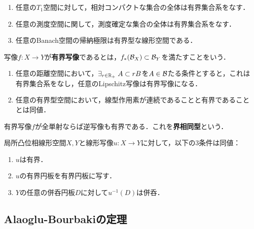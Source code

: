 \documentclass[uplatex,dvipdfmx]{jsreport}
\begin{document}
\begin{example}\mbox{}
    \begin{enumerate}
        \item 任意の$T_1$空間に対して，相対コンパクトな集合の全体は有界集合系をなす．
        \item 任意の測度空間に関して，測度確定な集合の全体は有界集合系をなす．
        \item 任意のBanach空間の帰納極限は有界型な線形空間である．
    \end{enumerate}
\end{example}

\begin{definition}[bounded]\label{def-bounded-function}
    写像$f:X\to Y$が\textbf{有界写像}であるとは，$f_*(\mathcal{B}_X)\subset\mathcal{B}_Y$を満たすことをいう．
\end{definition}

\begin{example}\mbox{}
    \begin{enumerate}
        \item 任意の距離空間において，$\exists_{r\in\mathbb{R}_+}\;A\subset rB$を$A\in\mathcal{B}$たる条件とすると，これは有界集合系をなし，任意のLipschitz写像は有界写像になる．
        \item 任意の有界型空間において，線型作用素が連続であることと有界であることとは同値．
    \end{enumerate}
\end{example}

\begin{proposition}
    有界写像$f$が全単射ならば逆写像も有界である．これを\textbf{界相同型}という．
\end{proposition}

\begin{theorem}
    局所凸位相線形空間$X,Y$と線形写像$u:X\to Y$に対して，以下の3条件は同値：
    \begin{enumerate}
        \item $u$は有界．
        \item $u$の有界円板を有界円板に写す．
        \item $Y$の任意の併呑円板$D$に対して$u^{-1}(D)$は併呑．
    \end{enumerate}
\end{theorem}

\subsection{Alaoglu-Bourbakiの定理}
\end{document}
